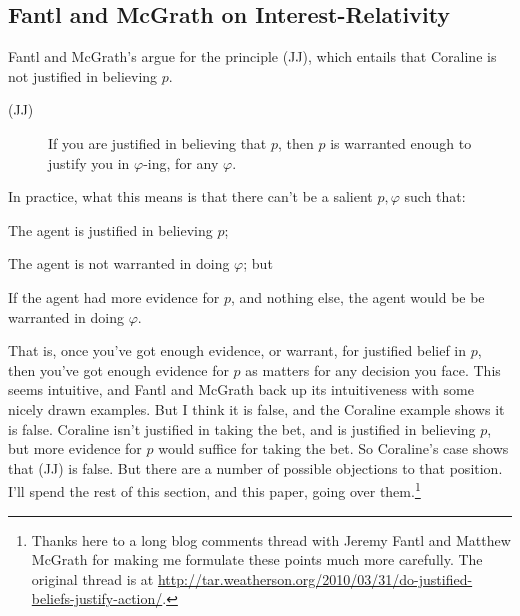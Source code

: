\documentclass[11pt,oneside]{book}
\newcommand{\objrep}[2]{
\bigskip
\noindent \textit{Objection}: #1

\medskip
\noindent \textit{Reply}: #2

}
\newcommand{\argconc}{
\renewcommand{\labelenumi}{\Alph{enumi}.}
\setcounter{enumi}{2}
}
\begin{document}
\subsection{Fantl and McGrath on Interest-Relativity}

Fantl and McGrath's argue for the principle (JJ), which entails that Coraline is not justified in believing $p$.

\begin{description}
\item[(JJ)] If you are justified in believing that $p$, then $p$ is warranted enough to justify you in $\varphi$-ing, for any $\varphi$. \cite[99]{FantlMcGrath2009}
\end{description}

\noindent In practice, what this means is that there can't be a salient $p, \varphi$ such that:

\begin{itemize*}
\item The agent is justified in believing $p$;
\item The agent is not warranted in doing $\varphi$; but
\item If the agent had more evidence for $p$, and nothing else, the agent would be be warranted in doing $\varphi$.
\end{itemize*}

\noindent That is, once you've got enough evidence, or warrant, for justified belief in $p$, then you've got enough evidence for $p$ as matters for any decision you face. This seems intuitive, and Fantl and McGrath back up its intuitiveness with some nicely drawn examples. But I think it is false, and the Coraline example shows it is false. Coraline isn't justified in taking the bet, and is justified in believing $p$, but more evidence for $p$ would suffice for taking the bet. So Coraline's case shows that (JJ) is false. But there are a number of possible objections to that position. I'll spend the rest of this section, and this paper, going over them.\footnote{Thanks here to a long blog comments thread with Jeremy Fantl and Matthew McGrath for making me formulate these points much more carefully. The original thread is at \url{http://tar.weatherson.org/2010/03/31/do-justified-beliefs-justify-action/}.}

\end{document}
